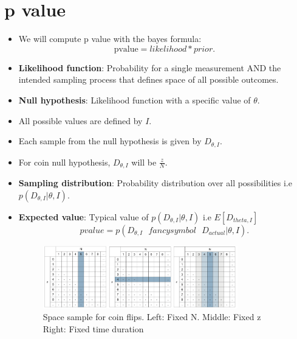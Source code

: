 \documentclass[a4paper]{article}
\begin{document}
\section{p value}
\begin{itemize}
    \item We will compute p value with the bayes formula:
        \[
            \text{pvalue} = likelihood * prior
        .\] 
    \item \textbf{Likelihood function}: Probability for a single measurement AND the intended sampling process that defines space of all possible outcomes.
    \item \textbf{Null hypothesis}: Likelihood function with a specific value of $\theta$.
    \item All possible values are defined by $I$.
    \item Each sample from the null hypothesis is given by  $D_{\theta, I}$.
    \item For coin null hypothesis,  $D_{\theta, I}$ will be $ \frac{z}{N}$.
    \item \textbf{Sampling distribution}: Probability distribution over all possibilities i.e $p(D_{\theta, I}|\theta, I)$.
    \item \textbf{Expected value}: Typical value of $p(D_{\theta, I}|\theta, I)$ i.e $E[D_{theta, I}]$
        \[
            pvalue = p(D_{\theta, I} \text{ } fancysymbol \text{ } D_{actual}|\theta, I)
        .\]  
        \begin{figure}[H]
            \centering
            \includegraphics[width=0.8\textwidth]{possible_outcomes}
            \caption{Space sample for coin flips. Left: Fixed N. Middle: Fixed z Right: Fixed time duration}
            \label{fig:possible_outcomes}
        \end{figure}
\end{itemize}
\end{document}

